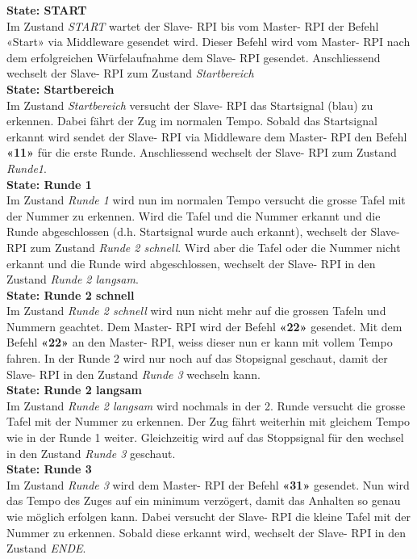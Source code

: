 \documentclass[../../main.tex]{subfiles}
\begin{document}
\newpage

\textbf{State: START}\\
Im Zustand \textit{START} wartet der Slave- RPI bis vom Master- RPI der Befehl «Start» via Middleware gesendet wird. Dieser Befehl wird vom Master- RPI nach dem erfolgreichen Würfelaufnahme dem Slave- RPI gesendet. Anschliessend wechselt der Slave- RPI zum Zustand \textit{Startbereich}\\

\textbf{State: Startbereich}\\
Im Zustand \textit{Startbereich} versucht der Slave- RPI das Startsignal (blau) zu erkennen. Dabei fährt der Zug im normalen Tempo. Sobald das Startsignal erkannt wird sendet der Slave- RPI via Middleware dem Master- RPI den Befehl \textbf{«11»} für die erste Runde. Anschliessend wechselt der Slave- RPI zum Zustand \textit{Runde1}.\\

\textbf{State: Runde 1}\\
Im Zustand \textit{Runde 1} wird nun im normalen Tempo versucht die grosse Tafel mit der Nummer zu erkennen. Wird die Tafel und die Nummer erkannt und die Runde abgeschlossen (d.h. Startsignal wurde auch erkannt), wechselt der Slave- RPI zum Zustand \textit{Runde 2 schnell}. Wird aber die Tafel oder die Nummer nicht erkannt und die Runde wird abgeschlossen, wechselt der Slave- RPI in den Zustand \textit{Runde 2 langsam}.\\

\textbf{State: Runde 2 schnell}\\
Im Zustand \textit{Runde 2 schnell} wird nun nicht mehr auf die grossen Tafeln und Nummern geachtet. Dem Master- RPI wird der Befehl \textbf{«22»} gesendet. Mit dem Befehl \textbf{«22»} an den Master- RPI, weiss dieser nun er kann mit vollem Tempo fahren. In der Runde 2 wird nur noch auf das Stopsignal geschaut, damit der Slave- RPI in den Zustand \textit{Runde 3} wechseln kann.\\

\textbf{State: Runde 2 langsam}\\
Im Zustand \textit{Runde 2 langsam} wird nochmals in der 2. Runde versucht die grosse Tafel mit der Nummer zu erkennen. Der Zug fährt weiterhin mit gleichem Tempo wie in der Runde 1 weiter. Gleichzeitig wird auf das Stoppsignal für den wechsel in den Zustand \textit{Runde 3} geschaut.\\

\textbf{State: Runde 3}\\
Im Zustand \textit{Runde 3} wird dem Master- RPI der Befehl \textbf{«31»} gesendet. Nun wird das Tempo des Zuges auf ein minimum verzögert, damit das Anhalten so genau wie möglich erfolgen kann. Dabei versucht der Slave- RPI die kleine Tafel mit der Nummer zu erkennen. Sobald diese erkannt wird, wechselt der Slave- RPI in den Zustand \textit{ENDE}.\\
\end{document}
